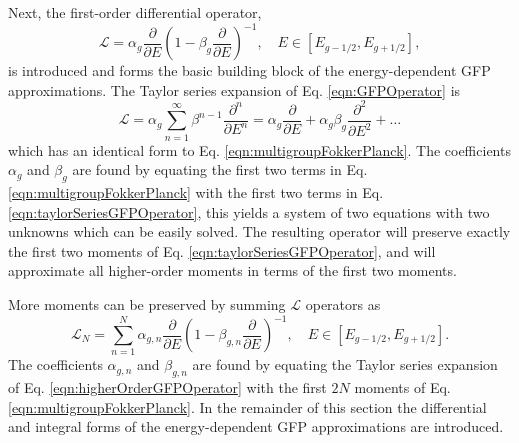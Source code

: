 \documentclass[../main.tex]{subfiles}
\begin{document}
Next, the first-order differential operator,
\begin{equation} \label{eqn:GFPOperator}
  \mathcal{L} = \alpha_g \dfrac{\partial}{\partial E} \left(1 - \beta_g \dfrac{\partial}{\partial E}\right)^{-1}, \quad E \in [E_{g-1/2}, E_{g+1/2}],
\end{equation}
is introduced and forms the basic building block of the energy-dependent GFP approximations. The Taylor series expansion of Eq. \eqref{eqn:GFPOperator} is
\begin{equation} \label{eqn:taylorSeriesGFPOperator}
  \mathcal{L} = \alpha_g \sum_{n=1}^{\infty} \beta^{n-1} \dfrac{\partial^n}{\partial E^n} = \alpha_g \dfrac{\partial}{\partial E} + \alpha_g \beta_g \dfrac{\partial^2}{\partial E^2} + \ldots
\end{equation}
which has an identical form to Eq. \eqref{eqn:multigroupFokkerPlanck}. The coefficients $\alpha_g$ and $\beta_g$ are found by equating the first two terms in Eq. \eqref{eqn:multigroupFokkerPlanck} with the first two terms in Eq. \eqref{eqn:taylorSeriesGFPOperator}, this yields a system of two equations with two unknowns which can be easily solved. The resulting operator will preserve exactly the first two moments of Eq. \eqref{eqn:taylorSeriesGFPOperator}, and will approximate all higher-order moments in terms of the first two moments. 

More moments can be preserved by summing $\mathcal{L}$ operators as
\begin{equation} \label{eqn:higherOrderGFPOperator}
  \mathcal{L}_N = \sum_{n=1}^{N} \alpha_{g,n} \dfrac{\partial}{\partial E} \left(1 - \beta_{g,n} \dfrac{\partial}{\partial E}\right)^{-1}, \quad E \in [E_{g-1/2}, E_{g+1/2}].
\end{equation}
The coefficients $\alpha_{g,n}$ and $\beta_{g,n}$ are found by equating the Taylor series expansion of Eq. \eqref{eqn:higherOrderGFPOperator} with the first $2N$ moments of Eq. \eqref{eqn:multigroupFokkerPlanck}. In the remainder of this section the differential and integral forms of the energy-dependent GFP approximations are introduced.
\end{document}

